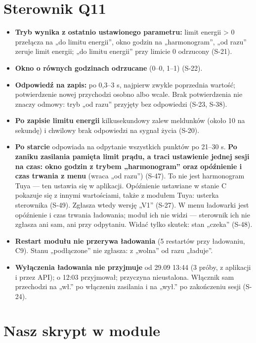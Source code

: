 \documentclass[11pt,a4paper]{article}
\begin{document}
\section*{Sterownik Q11}

\begin{itemize}
\item \textbf{Tryb wynika z ostatnio ustawionego parametru:} limit energii > 0 przełącza na „do limitu energii”, okno godzin na „harmonogram”, „od razu” zeruje limit energii; „do limitu energii” przy limicie 0 odrzucony (S-21).
\item \textbf{Okno o równych godzinach odrzucane} (0–0, 1–1) (S-22).
\item \textbf{Odpowiedź na zapis:} po 0,3–3 s, najpierw zwykle poprzednia wartość; potwierdzenie nowej przychodzi osobno albo wcale. Brak potwierdzenia nie znaczy odmowy: tryb „od razu” przyjęty bez odpowiedzi (S-23, S-38).
\item \textbf{Po zapisie limitu energii} kilkusekundowy zalew meldunków (około 10 na sekundę) i chwilowy brak odpowiedzi na sygnał życia (S-20).
\item \textbf{Po starcie} odpowiada na odpytanie wszystkich punktów po 21–30 s. \textbf{Po zaniku zasilania pamięta limit prądu, a traci ustawienie jednej sesji na czas: okno godzin z trybem „harmonogram” oraz opóźnienie i czas trwania z menu} (wraca „od razu”) (S-47). To nie jest harmonogram Tuya — ten ustawia się w aplikacji. Opóźnienie ustawiane w stanie C pokazuje się z innymi wartościami, także z modułem Tuya: usterka sterownika (S-49). Zgłasza wtedy wersję „V1” (S-27). W menu ładowarki jest opóźnienie i czas trwania ładowania; moduł ich nie widzi — sterownik ich nie zgłasza ani sam, ani przy odpytaniu. Widać tylko skutek: stan „czeka” (S-48).
\item \textbf{Restart modułu nie przerywa ładowania} (5 restartów przy ładowaniu, C9). Stanu „podłączone” nie zgłasza: z „wolna” od razu „ładuje”.
\item \textbf{Wyłączenia ładowania nie przyjmuje} od 29.09 13:44 (3 próby, z aplikacji i przez API); o 12:03 przyjmował; przyczyna nieustalona. Włącznik sam przechodzi na „wł.” po włączeniu zasilania i na „wył.” po zakończeniu sesji (S-24).
\end{itemize}

\section*{Nasz skrypt w module}
\end{document}
